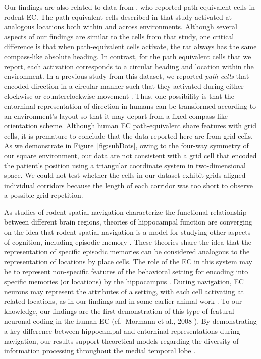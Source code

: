Our findings are also related to data from \citet{FranEtal00}, who reported path-equivalent cells in rodent EC.  The path-equivalent cells described in that study activated at analogous locations both within and across environments.  Although several aspects of our findings are similar to the cells from that study, one critical difference is that when path-equivalent cells activate, the rat always has the same compass-like absolute heading.  In contrast, for the path equivalent cells that we report, each activation corresponds to a circular heading and location within the environment.  In a previous study from this dataset, we reported \emph{path cells} that encoded direction in a circular manner such that they activated during either clockwise or counterclockwise movement \citep{JacoEtal10}.  Thus, one possibility is that the entorhinal representation of direction in humans can be transformed according to an environment's layout so that it may depart from a fixed compass-like orientation scheme. Although human EC path-equivalent share features with grid cells, it is premature to conclude that the data reported here are from grid cells.  As we demonstrate in Figure~\ref{fig:subDots}, owing to the four-way symmetry of our square environment, our data are not consistent with a grid cell that encoded the patient's position using a triangular coordinate system in two-dimensional space.  We could not test whether the cells in our dataset exhibit grids aligned  individual corridors \cite{DerdEtal09} because the length of each corridor was too short to observe a possible grid repetition.
 
As studies of rodent spatial navigation characterize the functional relationship between different brain regions, theories of hippocampal function are converging on the idea that rodent spatial navigation is a model for studying other aspects of cognition, including episodic memory \citep{EichEtal99,Buzs05,BuzsMose13,MoseMose13}. These theories share the idea that the representation of specific episodic memories can be considered analogous to the representation of locations by place cells. The role of the EC in this system may be to represent non-specific features of the behavioral setting \citep{HaftEtal05,SolsEtal08,SargEtal06,JacoEtal13,JacoEtal10} for encoding into specific memories (or locations) by the hippocampus \cite{NormORei03}. During navigation, EC neurons may  represent the attributes of a setting, with each cell activating at related   locations, as in our findings and in some earlier animal work  \cite{FranEtal00}.  To our knowledge, our findings are the first demonstration of this type of featural neuronal coding in the human EC (cf.\ Mormann et al., 2008 \cite{MormEtal08}). By demonstrating a key difference between hippocampal and entorhinal representations during navigation, our results support theoretical models regarding the diversity of information processing throughout the medial temporal lobe \cite{NormORei03,KnieEtal06,SolsEtal06}. 
 



